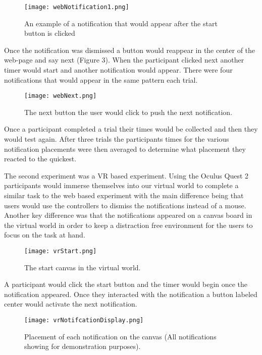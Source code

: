 \documentclass[acmlarge]{acmart}
\begin{document}
\begin{figure}[H]
  \caption{An example of a notification that would appear after the start button is clicked}
  \centering
  \texttt{[image: webNotification1.png]}
\end{figure}

Once the notification was dismissed a button would reappear in the center of the web-page and say next (Figure 3). When the participant clicked next another timer would start and another notification would appear. There were four notifications that would appear in the same pattern each trial. 
\begin{figure}[H]
  \caption{The next button the user would click to push the next notification.}
  \centering
  \texttt{[image: webNext.png]}
\end{figure}

Once a participant completed a trial their times would be collected and then they would test again. After three trials the participants times for the various notification placements were then averaged to determine what placement they reacted to the quickest.  



The second experiment was a VR based experiment. Using the Oculus Quest 2 participants would immerse themselves into our virtual world to complete a similar task to the web based experiment with the main difference being that users would use the controllers to dismiss the notifications instead of a mouse.
Another key difference was that the notifications appeared on a canvas board in the virtual world in order to keep a distraction free environment for the users to focus on the task at hand.
\begin{figure}[H]
   \caption{The start canvas in the virtual world.}
  \centering
  \texttt{[image: vrStart.png]}
\end{figure}

A participant would click the start button and the timer would begin once the notification appeared. Once they interacted with the notification a button labeled center would activate the next notification.

\begin{figure}[H]
   \caption{Placement of each notification on the canvas (All notifications showing for demonstration purposes).}
  \centering
  \texttt{[image: vrNotifcationDisplay.png]}
\end{figure}
\end{document}
